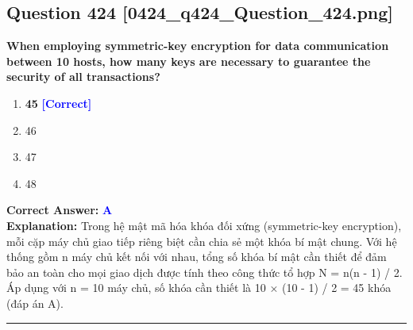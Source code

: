 \documentclass[11pt,a4paper]{article}
\begin{document}
\begin{minipage}{\textwidth}
\subsection*{Question 424 \quad \footnotesize{[0424\_q424\_Question\_424.png]}}
\noindent \textbf{When employing symmetric-key encryption for data communication between 10 hosts, how many keys are necessary to guarantee the security of all transactions?}

\begin{enumerate}[label=\Alph*.]
    \item \textbf{45} \hfill \textcolor{blue}{\textbf{[Correct]}}
    \item 46
    \item 47
    \item 48
\end{enumerate}

\noindent \textbf{Correct Answer:} \textcolor{blue}{\textbf{A}} \\[2pt]
\noindent \textbf{Explanation:} Trong hệ mật mã hóa khóa đối xứng (symmetric-key encryption), mỗi cặp máy chủ giao tiếp riêng biệt cần chia sẻ một khóa bí mật chung. Với hệ thống gồm n máy chủ kết nối với nhau, tổng số khóa bí mật cần thiết để đảm bảo an toàn cho mọi giao dịch được tính theo công thức tổ hợp N = n(n - 1) / 2. Áp dụng với n = 10 máy chủ, số khóa cần thiết là 10 × (10 - 1) / 2 = 45 khóa (đáp án A).

\par\vspace{0.3cm}
\hrule
\vspace{0.3cm}
\end{minipage}
\end{document}
